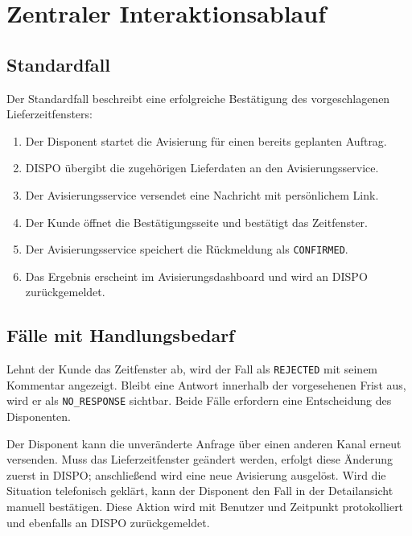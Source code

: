 \clearpage
\section{Zentraler Interaktionsablauf}

\subsection{Standardfall}

Der Standardfall beschreibt eine erfolgreiche Bestätigung des vorgeschlagenen
Lieferzeitfensters:

\begin{enumerate}
  \item Der Disponent startet die Avisierung für einen bereits geplanten Auftrag.
  \item DISPO übergibt die zugehörigen Lieferdaten an den Avisierungsservice.
  \item Der Avisierungsservice versendet eine Nachricht mit persönlichem Link.
  \item Der Kunde öffnet die Bestätigungsseite und bestätigt das Zeitfenster.
  \item Der Avisierungsservice speichert die Rückmeldung als \texttt{CONFIRMED}.
  \item Das Ergebnis erscheint im Avisierungsdashboard und wird an DISPO zurückgemeldet.
\end{enumerate}

\subsection{Fälle mit Handlungsbedarf}

Lehnt der Kunde das Zeitfenster ab, wird der Fall als \texttt{REJECTED} mit seinem Kommentar
angezeigt. Bleibt eine Antwort innerhalb der vorgesehenen Frist aus, wird er als
\texttt{NO\_RESPONSE} sichtbar. Beide Fälle erfordern eine Entscheidung des Disponenten.

Der Disponent kann die unveränderte Anfrage über einen anderen Kanal erneut versenden. Muss
das Lieferzeitfenster geändert werden, erfolgt diese Änderung zuerst in DISPO; anschlie\ss{}end
wird eine neue Avisierung ausgelöst. Wird die Situation telefonisch geklärt, kann der
Disponent den Fall in der Detailansicht manuell bestätigen. Diese Aktion wird mit Benutzer
und Zeitpunkt protokolliert und ebenfalls an DISPO zurückgemeldet.
